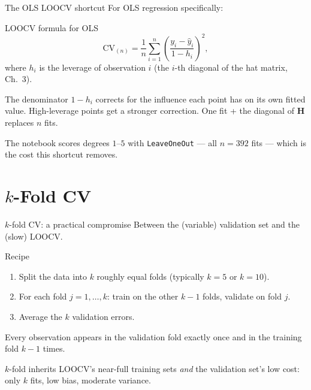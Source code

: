 \documentclass[aspectratio=169,11pt]{beamer}
\begin{document}
\begin{frame}{The OLS LOOCV shortcut}
  For OLS regression specifically:
  \begin{block}{LOOCV formula for OLS}
    \[
      \mathrm{CV}_{(n)} = \frac{1}{n}\sum_{i=1}^n
        \left(\frac{y_i - \hat y_i}{1 - h_i}\right)^2,
    \]
    where $h_i$ is the leverage of observation $i$ (the $i$-th
    diagonal of the hat matrix, Ch.~3).
  \end{block}
  \begin{readme}
    The denominator $1 - h_i$ corrects for the influence each point
    has on its own fitted value. High-leverage points get a stronger
    correction. One fit + the diagonal of $\mathbf{H}$ replaces $n$
    fits.
  \end{readme}
  \begin{labnote}
    The notebook scores degrees $1$--$5$ with \texttt{LeaveOneOut} --- all
    $n = 392$ fits --- which is the cost this shortcut removes.
  \end{labnote}
\end{frame}

\section{$k$-Fold CV}

\begin{frame}{$k$-fold CV: a practical compromise}
  Between the (variable) validation set and the (slow) LOOCV.
  \begin{block}{Recipe}
    \begin{enumerate}
      \item Split the data into $k$ roughly equal folds (typically
            $k = 5$ or $k = 10$).
      \item For each fold $j = 1, \ldots, k$: train on the other
            $k - 1$ folds, validate on fold $j$.
      \item Average the $k$ validation errors.
    \end{enumerate}
  \end{block}
  Every observation appears in the validation fold exactly once and
  in the training fold $k - 1$ times.
  \begin{takeaway}
    $k$-fold inherits LOOCV's near-full training sets \emph{and} the
    validation set's low cost: only $k$ fits, low bias, moderate
    variance.
  \end{takeaway}
\end{frame}
\end{document}
